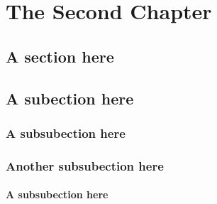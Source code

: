 \chapter{The Second Chapter}
\Blindtext%
\section{A section here} 
\Blindtext%
\section{A subection here} 
\Blindtext%
\subsection{A subsubection here} 
\Blindtext%
\subsection{Another subsubection here} 
\Blindtext%
\subsubsection{A subsubection here} 
\Blindtext%
\Blindtext%


